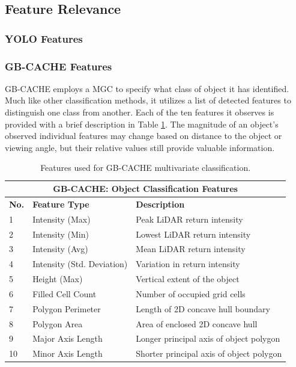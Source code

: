 \documentclass{erauthesis}
\begin{document}
\subsection{Feature Relevance} \label{features}

\subsubsection{YOLO Features} \label{features_yolo}

\subsubsection{GB-CACHE Features} \label{features_gbcache}

GB-CACHE employs a \acl{MGC} to specify what class of object it has identified. 
Much like other classification methods, it utilizes a list of detected features to distinguish one class from another.
Each of the ten features it observes is provided with a brief description in Table \ref{tab:gbcache_features}.
The magnitude of an object's observed individual features may change based on distance to the object or viewing angle, but their relative values still provide valuable information.

\begin{table}[htbp]
\centering
\begin{tabular}{lll}
\hline
\multicolumn{3}{c}{GB-CACHE: Object Classification Features}\\
\hline
\hline
\textbf{No.} & \textbf{Feature Type} & \textbf{Description} \\ 
\hline
1 & Intensity (Max) & Peak LiDAR return intensity \\
2 & Intensity (Min) & Lowest LiDAR return intensity \\
3 & Intensity (Avg) & Mean LiDAR return intensity \\
4 & Intensity (Std. Deviation) & Variation in return intensity \\
5 & Height (Max) & Vertical extent of the object \\
6 & Filled Cell Count & Number of occupied grid cells \\
7 & Polygon Perimeter & Length of 2D concave hull boundary \\
8 & Polygon Area & Area of enclosed 2D concave hull \\
9 & Major Axis Length & Longer principal axis of object polygon \\
10 & Minor Axis Length & Shorter principal axis of object polygon \\
\hline
\end{tabular}
\caption{Features used for GB-CACHE multivariate classification.}
\label{tab:gbcache_features}
\end{table}
\end{document}
